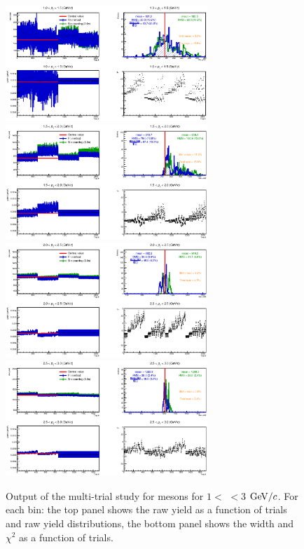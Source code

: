 \begin{figure}[!h]
\begin{center}
\includegraphics[width=0.68\textwidth]{figures/Dstar/pp13TeV/multi_trial/MultiFit_bkg4-Okt24_1-1.eps} 
\includegraphics[width=0.68\textwidth]{figures/Dstar/pp13TeV/multi_trial/MultiFit_bkg5-Okt24_1-2.eps}
\includegraphics[width=0.68\textwidth]{figures/Dstar/pp13TeV/multi_trial/MultiFit_bkg4-24Okt_2-2.eps}
\includegraphics[width=0.68\textwidth]{figures/Dstar/pp13TeV/multi_trial/MultiFit_bkg5_2-3.eps} 
\caption{Output of the multi-trial study for \Dstar mesons for $1<$ \pt$<3$ ${\rm GeV}/c$. For each \pt bin: the top panel shows the raw yield as a function of trials and raw yield distributions, the bottom panel shows the width and $\chi^2$ as a function of trials.}
\label{fig:DstarYieldSyst010_1}
\end{center}
\end{figure}


